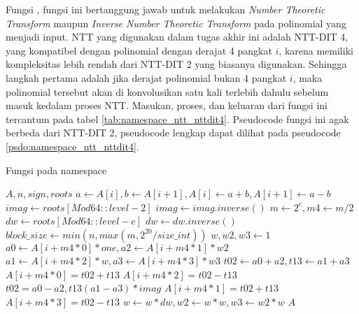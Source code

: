 \newpage

Fungsi , fungsi ini bertanggung jawab untuk melakukan \textit{Number Theoretic Transform} maupun \textit{Inverse Number Theoretic Transform} pada polinomial yang menjadi input. NTT yang digunakan dalam tugas akhir ini adalah NTT-DIT 4, yang kompatibel dengan polinomial dengan derajat 4 pangkat $ i $, karena memiliki kompleksitas lebih rendah dari NTT-DIT 2 yang biasanya digunakan. Sehingga langkah pertama adalah jika derajat polinomial bukan 4 pangkat $ i $, maka polinomial tersebut akan di konvolusikan satu kali terlebih dahulu sebelum masuk kedalam proses NTT. Masukan, proses, dan keluaran dari fungsi ini tercantum pada tabel \ref{tab:namespace_ntt_nttdit4}. Pseudocode fungsi ini agak berbeda dari NTT-DIT 2, pseudocode lengkap dapat dilihat pada pseudocode \ref{psdo:namespace_ntt_nttdit4}.

\begin{algorithm}
	\caption{Fungsi  pada namespace }
	\label{psdo:namespace_ntt_nttdit4}
	\begin{algorithmic}[1]
		\Require $ A, n, sign, roots $
		\State {}
		\State $ a \leftarrow A[i], b \leftarrow A[i+1], A[i] \leftarrow a + b, A[i+1] \leftarrow a - b $
			\EndFor
		\EndIf
		\State $ imag \leftarrow roots[Mod64::level - 2]$
		 $ imag \leftarrow imag.inverse() $ \EndIf
			\State $ m \leftarrow 2^{e} , m4 \leftarrow m / 2 $
			\State $ dw \leftarrow roots[Mod64::level - e]$
			 $ dw \leftarrow dw.inverse() $ \EndIf
			\State $ block\_size \leftarrow min(n, max(m, 2^{20}/size\_int))$
				\State $ w, w2, w3 \leftarrow 1$
							\State $ a0 \leftarrow A[i + m4 * 0] * one, a2 \leftarrow A[i + m4 * 1] * w2 $
							\State $ a1 \leftarrow A[i + m4 * 2] * w, a3 \leftarrow A[i + m4 * 3] * w3 $
							\State $ t02 \leftarrow a0 + a2, t13 \leftarrow a1 + a3$
							\State $ A[i + m4 * 0] = t02 + t13 $ 
							\State $ A[i + m4 * 2] = t02 - t13 $
							\State $ t02 = a0 - a2, t13 (a1 - a3) * imag$
							\State $ A[i + m4 * 1] = t02 + t1 3$ 
							\State $ A[i + m4 * 3] = t02 - t13 $
						\EndFor
						\State $ w \leftarrow w * dw, w2 \leftarrow w * w, w3 \leftarrow w2 * w $
				\EndFor
			\EndFor
		\EndFor
		\State \Return $ A $
	\end{algorithmic}
\end{algorithm}

